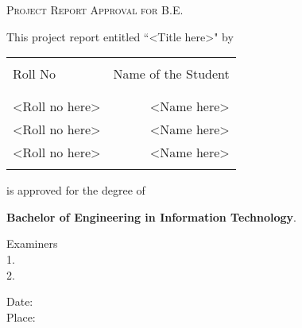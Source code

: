 \newpage

\begin{center}
    \Large \textsc {Project Report Approval for B.E.}\\[0.5cm]
\end{center}

\noindent This project report entitled ``<Title here>" by\\
\begin{table}[h]
    \centering
    \begin{tabular}{lr}\hline                           \\
        Roll No        & Name of the Student \\
        \\ \hline
        \\
        <Roll no here> & <Name here>         \\
        <Roll no here> & <Name here>         \\
        <Roll no here> & <Name here>         \\
        \\ \hline
    \end{tabular}
\end{table}

\noindent is approved for the degree of
\begin{center}
    \textbf{Bachelor of Engineering in Information Technology}.\\[1.5cm]
\end{center}

\begin{flushright}
    Examiners \\[0.5cm]
    1. \underline{\hspace{3cm}}\\[0.5cm]
    2. \underline{\hspace{3cm}}\\[0.5cm]
\end{flushright}

\begin{flushleft}
    Date:\\[0.5cm]
    Place:\\[0.5cm]
\end{flushleft}
